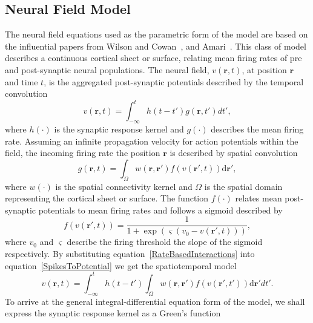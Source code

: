 \documentclass[]{article}
\begin{document}
\subsection{Neural Field Model}
The neural field equations used as the parametric form of the model are based on the influential papers from Wilson and Cowan~\cite{Wilson1973}, and Amari~\cite{Amari1977}. This class of model describes a continuous cortical sheet or surface, relating mean firing rates of pre and post-synaptic neural populations. The neural field, $v\left( {\mathbf{r},t} \right)$, at position $\mathbf{r}$ and time $t$, is the aggregated post-synaptic potentials described by the temporal convolution 
\begin{equation}
	\label{SpikesToPotential} v\left( {\mathbf{r},t} \right) = \int_{ - \infty }^t {h\left( {t - t'} \right)g\left( {\mathbf{r},t'} \right)dt'}, 
\end{equation}   
where $h(\cdot)$ is the synaptic response kernel and $g(\cdot)$ describes the mean firing rate. Assuming an infinite propagation velocity for action potentials within the field, the incoming firing rate the position $\mathbf{r}$ is described by spatial convolution
\begin{equation}
	\label{RateBasedInteractions} g\left( \mathbf{r},t \right) = \int_\Omega {w\left( \mathbf{r},\mathbf{r}' \right)f\left( v\left( \mathbf{r}',t \right) \right)\textrm{d}\mathbf{r}'}, 
\end{equation}
where $w(\cdot)$ is the spatial connectivity kernel and $\Omega$ is the spatial domain representing the cortical sheet or surface. The function $f(\cdot)$ relates mean post-synaptic potentials to mean firing rates and follows a sigmoid described by
\begin{equation}
	\label{ActivationFunction} f\left( v\left( \mathbf{r}', t \right) \right) = \frac{1}{1 + \exp \left( \varsigma \left( v_0 - v\left(\mathbf{r}',t\right) \right) \right)}, 
\end{equation}
where $v_0$ and $\varsigma$ describe the firing threshold the slope of the sigmoid respectively. By substituting equation~\ref{RateBasedInteractions} into equation~\ref{SpikesToPotential} we get the spatiotemporal model 
\begin{equation}
	\label{FullDoubleIntModel} v\left(\mathbf{r},t\right) =
	\int_{-\infty}^t 
	h\left(t - t'\right) \int_\Omega
	w\left(\mathbf{r},\mathbf{r}'\right) 
	f\left( v\left( \mathbf{r}',t' \right)\right)
	\textrm{d}\mathbf{r}'dt'.
\end{equation}
To arrive at the general integral-differential equation form of the model, we shall express the synaptic response kernel as a Green's function 
\end{document}
